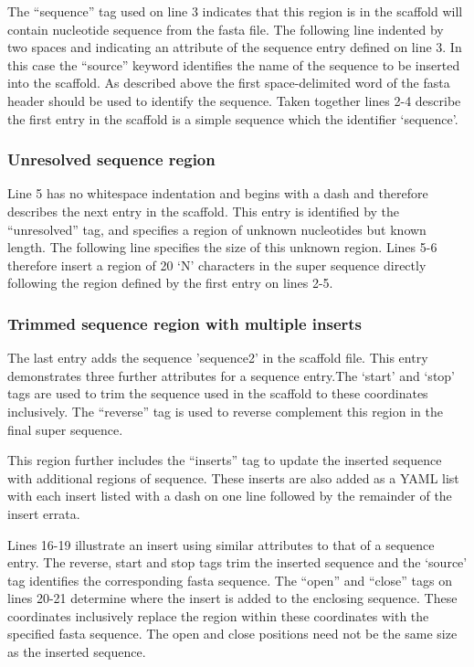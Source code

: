\documentclass[10pt]{bmc_article}
\newenvironment{bmcformat}{\begin{raggedright}\baselineskip20pt\sloppy\setboolean{publ}{false}}{\end{raggedright}\baselineskip20pt\sloppy}
\begin{document}
\begin{bmcformat}
The ``sequence'' tag used on line 3 indicates that this region is in the
scaffold will contain nucleotide sequence from the fasta file. The following
line indented by two spaces and indicating an attribute of the sequence entry
defined on line 3. In this case the ``source'' keyword identifies the name of
the sequence to be inserted into the scaffold. As described above the first
space-delimited word of the fasta header should be used to identify the
sequence. Taken together lines 2-4 describe the first entry in the scaffold is
a simple sequence which the identifier `sequence'. \pb

\subsubsection*{Unresolved sequence region} %

Line 5 has no whitespace indentation and begins with a dash and therefore
describes the next entry in the scaffold. This entry is identified by the
``unresolved'' tag, and specifies a region of unknown nucleotides but known
length. The following line specifies the size of this unknown region. Lines 5-6
therefore insert a region of 20 `N' characters in the super sequence directly
following the region defined by the first entry on lines 2-5. \pb

\subsubsection*{Trimmed sequence region with multiple inserts} %

The last entry adds the sequence 'sequence2' in the scaffold file. This entry
demonstrates three further attributes for a sequence entry.The `start' and
`stop' tags are used to trim the sequence used in the scaffold to these
coordinates inclusively. The ``reverse'' tag is used to reverse complement this
region in the final super sequence. \pb

This region further includes the ``inserts'' tag to update the inserted
sequence with additional regions of sequence. These inserts are also added as
a YAML list with each insert listed with a dash on one line followed by the
remainder of the insert errata. \pb

Lines 16-19 illustrate an insert using similar attributes to that of a sequence
entry. The reverse, start and stop tags trim the inserted sequence and the
`source' tag identifies the corresponding fasta sequence. The ``open'' and
``close'' tags on lines 20-21 determine where the insert is added to the
enclosing sequence.  These coordinates inclusively replace the region within
these coordinates with the specified fasta sequence. The open and close
positions need not be the same size as the inserted sequence. \pb


\end{bmcformat}
\end{document}
